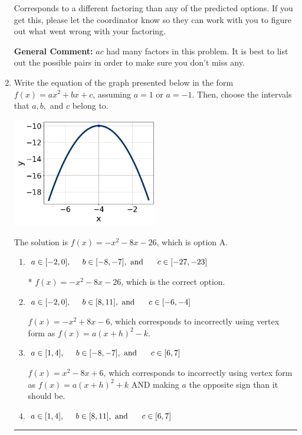 \documentclass{extbook}[14pt]
\newcommand{\litem}[1]{\item #1

\rule{\textwidth}{0.4pt}}
\begin{document}
\begin{enumerate}
{\begin{enumerate}[label=\Alph*.]
 Corresponds to a different factoring than any of the predicted options. If you get this, please let the coordinator know so they can work with you to figure out what went wrong with your factoring.
\end{enumerate}

\textbf{General Comment:} $ac$ had many factors in this problem. It is best to list out the possible pairs in order to make sure you don't miss any.
}
\litem{
Write the equation of the graph presented below in the form $f(x)=ax^2+bx+c$, assuming  $a=1$ or $a=-1$. Then, choose the intervals that $a, b,$ and $c$ belong to.

\begin{center}
    \includegraphics[width=0.5\textwidth]{../Figures/quadraticGraphToEquationCopyB.png}
\end{center}


The solution is \( f(x) = -x^{2} -8 x -26 \), which is option A.\begin{enumerate}[label=\Alph*.]
\item \( a \in [-2, 0], \hspace*{5mm} b \in [-8, -7], \text{ and } \hspace*{5mm} c \in [-27, -23] \)

* $f(x)=-x^{2} -8 x -26$, which is the correct option.
\item \( a \in [-2, 0], \hspace*{5mm} b \in [8, 11], \text{ and } \hspace*{5mm} c \in [-6, -4] \)

$f(x)=-x^{2} +8 x -6$, which corresponds to incorrectly using vertex form as $f(x) = a(x+h)^2 - k$.
\item \( a \in [1, 4], \hspace*{5mm} b \in [-8, -7], \text{ and } \hspace*{5mm} c \in [6, 7] \)

$f(x)=x^{2} -8 x + 6$, which corresponds to incorrectly using vertex form as $f(x) = a(x+h)^2+k$ AND making $a$ the opposite sign than it should be.
\item \( a \in [1, 4], \hspace*{5mm} b \in [8, 11], \text{ and } \hspace*{5mm} c \in [6, 7] \)


\end{enumerate}}
\end{enumerate}
\end{document}
